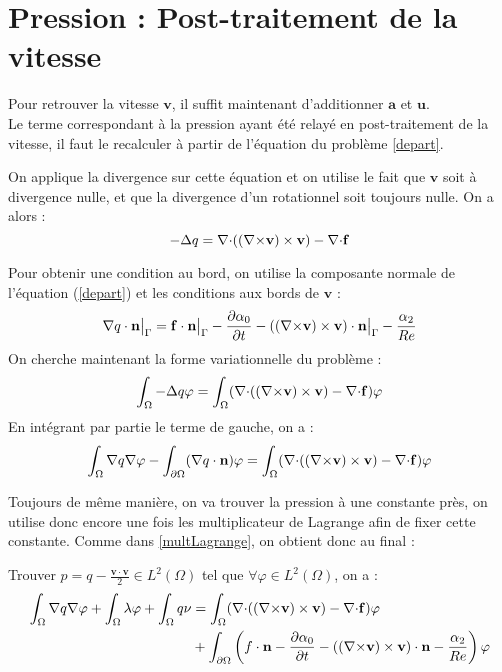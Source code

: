 \section{Pression : Post-traitement de la vitesse}
\label{pression}
Pour retrouver la vitesse $\mathbf{v}$, il suffit maintenant d'additionner $\mathbf{a}$ et $\mathbf{u}$.\\
Le terme correspondant à la pression ayant été relayé en post-traitement de la vitesse, il faut le recalculer à partir de l'équation du problème \ref{depart}.

On applique la divergence sur cette équation et on utilise le fait que $\mathbf{v}$ soit à divergence nulle, et que la divergence d'un rotationnel soit toujours nulle. On a alors :
\begin{equation*}
-{\Delta} q = {\nabla\cdot}(({\nabla\times} \mathbf{v})\times \mathbf{v}) - {\nabla\cdot} \mathbf{f}
\end{equation*}

Pour obtenir une condition au bord, on utilise la composante normale de l'équation (\ref{depart}) et les conditions aux bords de $\mathbf{v}$ :
\[ {\nabla} q\cdot \mathbf{n}{\big\rvert_{\Gamma}} =  \mathbf{f}\cdot \mathbf{n}{\big\rvert_{\Gamma}} - \frac{\partial\alpha_0}{\partial t} - (({\nabla\times} \mathbf{v})\times \mathbf{v})\cdot \mathbf{n}{\big\rvert_{\Gamma}} - \frac{\alpha_2}{Re} \]
On cherche maintenant la forme variationnelle du problème :
\[ \int_\Omega -{\Delta} q\varphi = \int_\Omega ({\nabla\cdot}(({\nabla\times} \mathbf{v})\times \mathbf{v}) -{\nabla\cdot} \mathbf{f})\varphi \]
En intégrant par partie le terme de gauche, on a :
\[ \int_\Omega {\nabla} q{\nabla}\varphi - \int_{\partial\Omega} ({\nabla} q\cdot \mathbf{n})\varphi = \int_\Omega ({\nabla\cdot}(({\nabla\times} \mathbf{v})\times \mathbf{v}) -{\nabla\cdot} \mathbf{f})\varphi \]

Toujours de même manière, on va trouver la pression à une constante près, on utilise donc encore une fois les multiplicateur de Lagrange afin de fixer cette constante. Comme dans \ref{multLagrange}, on obtient donc au final :
\begin{pb}\label{fvq}
Trouver $p=q-\frac{\mathbf{v}\cdot\mathbf{v}}{2} \in L^2(\Omega)$ tel que $\forall \varphi\in L^2(\Omega)$, on a :
\begin{align*}
\int_\Omega {\nabla} q{\nabla}\varphi + \int_\Omega \lambda\varphi + \int_\Omega q\nu &= \int_\Omega ({\nabla\cdot}(({\nabla\times} \mathbf{v})\times \mathbf{v}) -{\nabla\cdot} \mathbf{f})\varphi\\
&+ \int_{\partial\Omega} \left(f\cdot \mathbf{n} - \frac{\partial\alpha_0}{\partial t} - (({\nabla\times} \mathbf{v})\times \mathbf{v})\cdot \mathbf{n} - \frac{\alpha_2}{Re}\right)\varphi
\end{align*}\end{pb}

